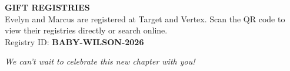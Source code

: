 \documentclass[11pt,letterpaper]{article}
\begin{document}
\begin{tcolorbox}
    \begin{minipage}[c]{0.60\linewidth}
        \raggedright
        {\color{accent}\bfseries\large GIFT REGISTRIES}\\[4pt]
        {\small Evelyn and Marcus are registered at Target and Vertex.
        Scan the QR code to view their registries directly or search online.}\\[6pt]
        {\footnotesize Registry ID: \textbf{BABY-WILSON-2026}}
    \end{minipage}\hfill
    \begin{minipage}[c]{0.30\linewidth}
        \centering
        \begin{tcolorbox}[
            colback=white,
            colframe=accent!30,
            boxrule=1.5pt,
            arc=4pt,
            width=2.4cm,
            height=2.4cm,
            boxsep=0pt,
            top=3pt, bottom=3pt, left=3pt, right=3pt
        ]
        \end{tcolorbox}
    \end{minipage}
    
    \vfill
    
    {\color{gold!90!black}\large\textit{We can't wait to celebrate this new chapter with you!}}
    
    \vspace*{0.4cm}
\end{tcolorbox}
\end{document}
